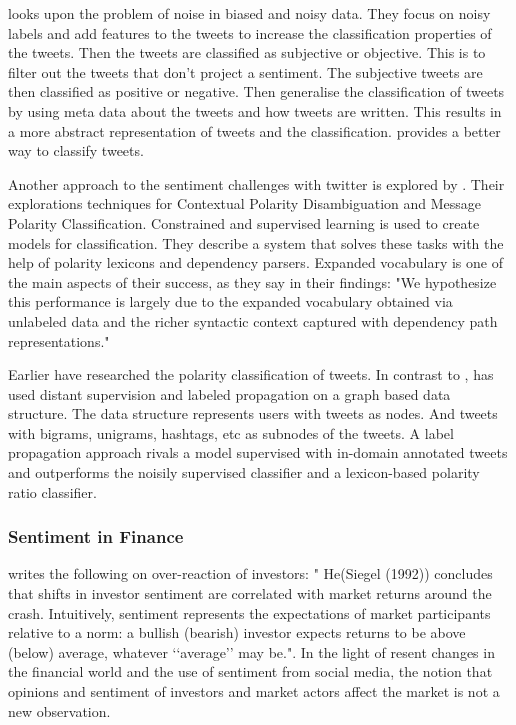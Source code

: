 \cite[]{barbosa10} looks upon the problem of noise in biased and noisy data. 
They focus on noisy labels and add features to the tweets to increase the
classification properties of the tweets. Then the tweets are classified as
subjective or objective. This is to filter out the tweets that don't project a
sentiment. The subjective tweets are then classified as positive or negative.
Then \cite[]{barbosa10} generalise the classification of tweets by using meta
data about the tweets and how tweets are written. This results in a more
abstract representation of tweets and the classification. \cite[]{barbosa10}
provides a better way to classify tweets.

Another approach to the sentiment challenges with twitter is explored by
\cite[]{becker13}. Their explorations techniques for Contextual Polarity Disambiguation
and Message Polarity Classification. Constrained and supervised learning is
used to create models for classification. They describe a system that solves
these tasks with the help of polarity lexicons and dependency parsers. 
Expanded vocabulary is one of the main aspects of their success, as they say in
their findings: "We hypothesize this performance is largely due to the expanded vocabulary
obtained via unlabeled data and the richer syntactic context captured with
dependency path representations." \cite[]{becker13}

Earlier \cite[]{sperious11} have researched the polarity classification of tweets. 
In contrast to \cite[]{becker13}, \cite[]{sperious11} has used distant
supervision and labeled propagation on a graph based data structure. The data
structure represents users with tweets as nodes. And tweets with bigrams,
unigrams, hashtags, etc as subnodes of the tweets. A label propagation approach
rivals a model supervised with in-domain annotated tweets and outperforms the
noisily supervised classifier and a lexicon-based polarity ratio classifier.
\cite[]{sperious11} 

\subsubsection{Sentiment in Finance}
\cite[p2]{Brown20041} writes the following on over-reaction of investors: "
He(Siegel (1992)) concludes that shifts in investor sentiment are correlated
with market returns around the crash. Intuitively, sentiment represents the
expectations of market participants relative to a norm: a bullish (bearish)
investor expects returns to be above (below) average, whatever ‘‘average’’ may
be.". In the light of resent changes in the financial world and the use
of sentiment from social media, the notion that opinions and sentiment of
investors and market actors affect the market is not a new observation.

